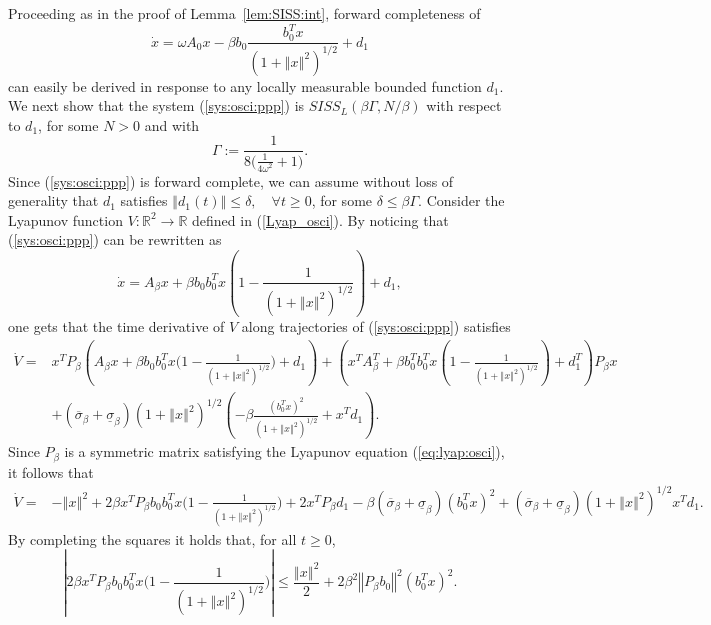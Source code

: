 \documentclass[letterpaper, 10pt]{article}
\newcommand{\rref}[1]{(\ref{#1})}
\newcommand{\norme}[1]{\left\Vert #1\right\Vert}
\newcommand{\abs}[1]{\left| #1 \right|}
\newcommand{\reels}{\mathbb{R}}
\begin{document}
Proceeding as in the proof of Lemma~\ref{lem:SISS:int}, forward completeness of 
\begin{equation}\label{sys:osci:ppp}
\dot{x}= \omega A_0 x - \beta  b_0 \frac{b_0^T x}{(1+ \norme{x}^2)^{1/2}}+d_1
\end{equation} 
can easily be derived in response to any locally measurable bounded function $d_1$. 
We next show that  the system \rref{sys:osci:ppp} is $SISS_L(\beta \Gamma  , N / \beta )$ with respect to $d_1$, for some $N>0$ and with
\begin{equation}
\label{pr:elm:osci:Delta}
\Gamma := \frac{1}{8\big(  \frac{1}{4 \omega^2} +1 \big)}.
\end{equation}
Since \rref{sys:osci:ppp} is forward complete, we can assume without loss of generality that $d_1$ satisfies $\norme{d_1(t) } \leq \delta , \quad \forall t \geq 0$, for some $\delta \leq   \beta \Gamma $. Consider the Lyapunov function $V : \reels^2 \to \reels$ defined in \rref{Lyap_osci}. By noticing that \rref{sys:osci:ppp} can be rewritten as
\begin{equation*}
\dot{x}= A_{\beta} x + \beta b_0 b_0^T x \left( 1  - \frac{1 }{(1+ \norme{x}^2)^{1/2}}\right)+  d_1,
\end{equation*} 
one gets that the time derivative of $V $ along trajectories of \rref{sys:osci:ppp} satisfies 
\begin{align*}
\dot{V}= &  x^T  P_\beta \left( A_{\beta} x + \beta b_0 b_0^T x \Big( 1  - \frac{1}{(1+ \norme{x}^2)^{1/2}} \Big)+  d_1 \right) +  \left(x^T A_{\beta}^T + \beta b_0^T  b_0^T x ( 1  - \frac{1 }{(1+ \norme{x}^2)^{1/2}})+  d_1^T \right)  P_\beta x  \\ 
 &+   (\overline{\sigma}_{\beta} + \underline{\sigma}_{\beta} )(1+ \norme{x}^2)^{1/2} \left(  - \beta  \frac{ (b_0^T x)^2}{(1+ \norme{x}^2)^{1/2}}+  x^T d_1 \right).
\end{align*} Since $ P_\beta$ is a symmetric matrix satisfying the Lyapunov equation \rref{eq:lyap:osci}, it follows that
\begin{align*}
\dot{V} = & -  \norme{x}^2 + 2  \beta  x^T P_\beta b_0  b_0^T  x   \Big( 1  - \frac{1 }{(1+ \norme{x}^2)^{1/2}} \Big)+ 2 x^T  P_\beta  d_1    -  \beta   (\overline{\sigma}_{\beta} + \underline{\sigma}_{\beta} )(b_0^T x)^2+  (\overline{\sigma}_{\beta} + \underline{\sigma}_{\beta} ) (1+ \norme{x}^2)^{1/2}  x^T d_1 .
\end{align*}
By completing the squares it holds that, for all $t\geq 0$,
\begin{equation*}
\abs{ 2 \beta  x^T  P_\beta b_0  b_0^T  x  \Big( 1  - \frac{1 }{(1+ \norme{x}^2)^{1/2}} \Big)} \leq \frac{\norme{x}^2}{2} + 2  \beta^2 \norme{ P_\beta b_0}^2 (b_0^T x)^2.
\end{equation*}
\end{document}
